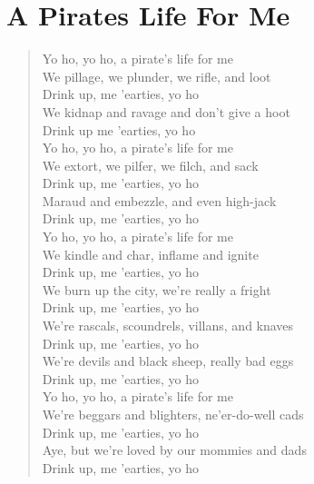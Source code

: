 \documentclass[11pt]{article}
\begin{document}
\section{A Pirates Life For Me}
\label{sec:orga01ccb7}
\begin{verse}
Yo ho, yo ho, a pirate's life for me\\
We pillage, we plunder, we rifle, and loot\\
Drink up, me 'earties, yo ho\\
We kidnap and ravage and don't give a hoot\\
Drink up me 'earties, yo ho\\
\vspace*{1em}
Yo ho, yo ho, a pirate's life for me\\
We extort, we pilfer, we filch, and sack\\
Drink up, me 'earties, yo ho\\
Maraud and embezzle, and even high-jack\\
Drink up, me 'earties, yo ho\\
\vspace*{1em}
Yo ho, yo ho, a pirate's life for me\\
We kindle and char, inflame and ignite\\
Drink up, me 'earties, yo ho\\
We burn up the city, we're really a fright\\
Drink up, me 'earties, yo ho\\
\vspace*{1em}
We're rascals, scoundrels, villans, and knaves\\
Drink up, me 'earties, yo ho\\
We're devils and black sheep, really bad eggs\\
Drink up, me 'earties, yo ho\\
\vspace*{1em}
Yo ho, yo ho, a pirate's life for me\\
We're beggars and blighters, ne'er-do-well cads\\
Drink up, me 'earties, yo ho\\
Aye, but we're loved by our mommies and dads\\
Drink up, me 'earties, yo ho\\
\end{verse}
\clearpage
\end{document}
